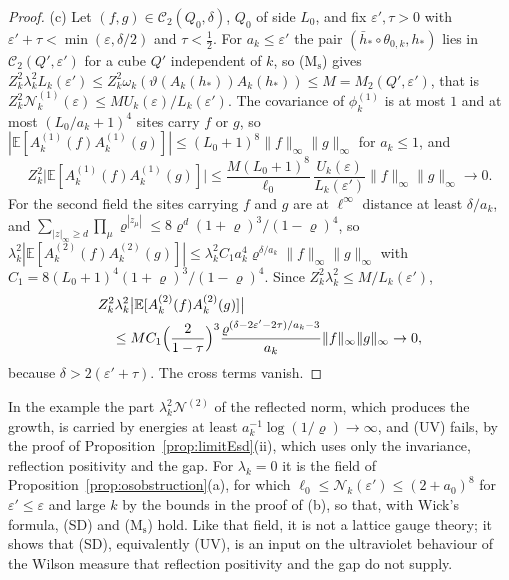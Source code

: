 \documentclass[aps,prd,twocolumn,superscriptaddress,nofootinbib,longbibliography,floatfix,amsmath,amssymb,10pt]{revtex4-2}
\theoremstyle{definition}
\theoremstyle{remark}
\newcommand{\E}{\mathbb{E}}
\begin{document}
\begin{proof}
(c) Let $(f,g)\in\mathcal C_2(Q_0,\delta)$, $Q_0$ of side $L_0$, and fix
$\varepsilon',\tau>0$ with $\varepsilon'+\tau<\min(\varepsilon,\delta/2)$
and $\tau<\frac12$. For $a_k\le\varepsilon'$ the pair $(\bar h_*\circ
\theta_{0,k},h_*)$ lies in $\mathcal C_2(Q',\varepsilon')$ for a cube $Q'$
independent of $k$, so (M$_{\mathrm s}$) gives $Z_k^2\lambda_k^2
L_k(\varepsilon')\le Z_k^2\omega_k(\vartheta(A_k(h_*))A_k(h_*))\le
M=M_2(Q',\varepsilon')$, that is $Z_k^2\mathcal N^{(1)}_k(\varepsilon)\le MU_k(
\varepsilon)/L_k(\varepsilon')$. The covariance of $\phi^{(1)}_k$ is at
most $1$ and at most $(L_0/a_k+1)^4$ sites carry $f$ or $g$, so
$|\E[A^{(1)}_k(f)A^{(1)}_k(g)]|\le(L_0+1)^8\|f\|_\infty\|g\|_\infty$ for
$a_k\le1$, and
\[
Z_k^2\bigl|\E[A^{(1)}_k(f)A^{(1)}_k(g)]\bigr|\le\frac{M(L_0+1)^8}{\ell_0}
\,\frac{U_k(\varepsilon)}{L_k(\varepsilon')}\|f\|_\infty\|g\|_\infty\to0 .
\]
For the second field the sites carrying $f$ and $g$ are at
$\ell^\infty$ distance at least $\delta/a_k$, and $\sum_{|z|_\infty\ge d}
\prod_\mu \varrho^{|z_\mu|}\le8\varrho^d(1+\varrho)^3/(1-\varrho)^4$, so
$\lambda_k^2|\E[A^{(2)}_k(f)A^{(2)}_k(g)]|\le\lambda_k^2C_1a_k^4
\varrho^{\delta/a_k}\|f\|_\infty\|g\|_\infty$ with $C_1=8(L_0+1)^4(1+\varrho)^3/
(1-\varrho)^4$. Since $Z_k^2\lambda_k^2\le M/L_k(\varepsilon')$,
\[
\begin{split}
&Z_k^2\lambda_k^2\bigl|\E[A^{(2)}_k(f)A^{(2)}_k(g)]\bigr|\\
&\quad\le MC_1\Bigl(\frac2{1-\tau}\Bigr)^3\frac{\varrho^{(\delta-2
\varepsilon'-2\tau)/a_k-3}}{a_k}\|f\|_\infty\|g\|_\infty\to0 ,
\end{split}
\]
because $\delta>2(\varepsilon'+\tau)$. The cross terms vanish.
\end{proof}

In the example the part $\lambda_k^2\mathcal N^{(2)}$ of the reflected norm,
which produces the growth, is carried by energies at least
$a_k^{-1}\log(1/\varrho)\to\infty$, and (UV) fails, by the proof of
Proposition~\ref{prop:limitEsd}(ii), which uses only the invariance,
reflection positivity and the gap. For $\lambda_k=0$ it is the field of
Proposition~\ref{prop:osobstruction}(a), for which $\ell_0\le\mathcal N_k(\varepsilon')\le(2+a_0)^8$ for $\varepsilon'\le\varepsilon$ and large $k$ by the bounds in the proof of (b), so that, with Wick's formula, (SD) and
(M$_{\mathrm s}$) hold. Like that field, it is not a lattice gauge theory; it shows that
(SD), equivalently (UV), is an input on the ultraviolet behaviour of the
Wilson measure that reflection positivity and the gap do not supply.
\end{document}
